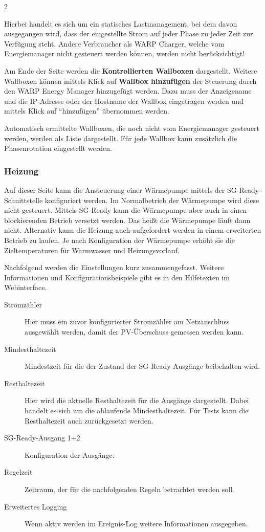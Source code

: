 \documentclass[a4paper,10pt]{article}
\newcommand{\hint}[1]{\begin{tcolorbox}[colback=boxgray,colframe=black,coltext=
white,title=Hinweis,left*=2mm,right*=2mm,boxsep=1mm,bottom=1mm,top=1mm]#1\end{tcolorbox}}
\begin{document}
\begin{multicols*}{2}
	\hint{Hierbei handelt es sich um ein statisches Lastmanagement, bei dem
	davon ausgegangen wird, dass der eingestellte Strom auf jeder Phase
	zu jeder Zeit zur Verfügung steht. Andere Verbraucher als WARP Charger,
	welche vom Energiemanager nicht gesteuert werden können, werden nicht
	berücksichtigt!}

	Am Ende der Seite werden die \textbf{Kontrollierten
	Wallboxen} dargestellt. Weitere Wallboxen können mittels Klick auf
	\textbf{Wallbox hinzufügen} der Steuerung durch den WARP Energy Manager
	hinzugefügt werden. Dazu muss der Anzeigename und die IP-Adresse oder der
	Hostname der Wallbox eingetragen werden und mittels Klick auf \enquote{hinzufügen} übernommen werden.

	Automatisch ermittelte Wallboxen, die noch nicht vom Energiemanager
	gesteuert werden, werden als Liste dargestellt. Für jede Wallbox kann zusätzlich
    die Phasenrotation eingestellt werden.

    \subsubsection{Heizung}


    Auf dieser Seite kann die Ansteuerung einer Wärmepumpe mittels der SG-Ready-Schnittstelle konfiguriert werden. Im Normalbetrieb der Wärmepumpe wird diese nicht gesteuert.
    Mittels SG-Ready kann die Wärmepumpe aber auch in einen blockierenden Betrieb versetzt werden. Das heißt die Wärmepumpe läuft dann nicht.
    Alternativ kann die Heizung auch aufgefordert werden in einem erweiterten Betrieb zu laufen. Je nach Konfiguration der Wärmepumpe erhöht sie die Zieltemperaturen für Warmwasser und Heizungsvorlauf.

    Nachfolgend werden die Einstellungen kurz zusammengefasst. Weitere Informationen und Konfigurationsbeispiele gibt es in den Hilfetexten
    im Webinterface.

   	\begin{description}
    \item[Stromzähler] Hier muss ein zuvor konfigurierter Stromzähler am Netzanschluss ausgewählt werden, damit der PV-Überschuss gemessen werden kann.
    \item[Mindesthaltezeit] Mindestzeit für die der Zustand der SG-Ready Ausgänge beibehalten wird.
    \item[Resthaltezeit] Hier wird die aktuelle Resthaltezeit für die Ausgänge dargestellt. Dabei handelt es sich um die ablaufende Mindesthaltezeit. Für Tests kann die Resthaltezeit auch zurückgesetzt werden.
    \item[SG-Ready-Ausgang 1+2] Konfiguration der Ausgänge.
    \item[Regelzeit] Zeitraum, der für die nachfolgenden Regeln betrachtet werden soll.
    \item[Erweitertes Logging] Wenn aktiv werden im Ereignis-Log weitere Informationen ausgegeben.
   	\end{description}



\end{multicols*}
\end{document}
